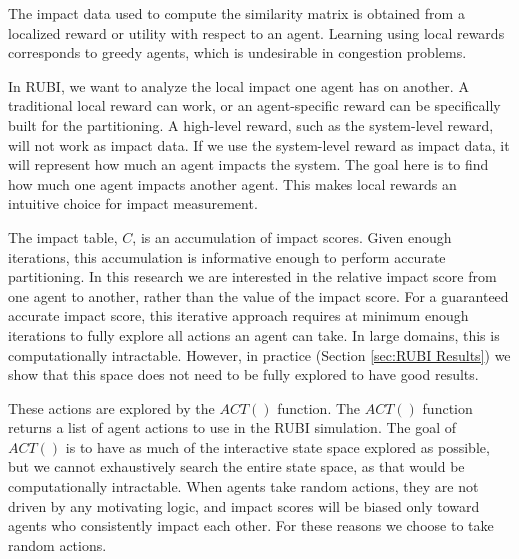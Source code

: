 \documentclass[smallcondensed]{svjour3}
\begin{document}
The impact data used to compute the similarity matrix is obtained from a localized reward or utility with respect to an agent. Learning using local rewards corresponds to greedy agents, which is undesirable in congestion problems.

In RUBI, we want to analyze the local impact one agent has on another. A traditional local reward can work, or an agent-specific reward can be specifically built for the partitioning. A high-level reward, such as the system-level reward, will not work as impact data. If we use the system-level reward as impact data, it will represent how much an agent impacts the system. The goal here is to find how much one agent impacts another agent. This makes local rewards an intuitive choice for impact measurement.

The impact table, $C$, is an accumulation of impact scores. Given enough iterations, this accumulation is informative enough to perform accurate partitioning. In this research we are interested in the relative impact score from one agent to another, rather than the value of the impact score. For a guaranteed accurate impact score, this iterative approach requires at minimum enough iterations to fully explore all actions an agent can take. In large domains, this is computationally intractable. However, in practice (Section \ref{sec:RUBI Results}) we show that this space does not need to be fully explored to have good results.

These actions are explored by the $ACT()$ function. The $ACT()$ function returns a list of agent actions to use in the RUBI simulation. The goal of $ACT()$ is to have as much of the interactive state space explored as possible, but we cannot exhaustively search the entire state space, as that would be computationally intractable. When agents take random actions, they are not driven by any motivating logic, and impact scores will be biased only toward agents who consistently impact each other. For these reasons we choose to take random actions.

\end{document}
